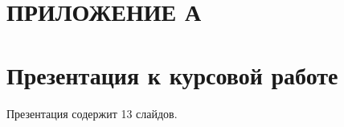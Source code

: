 




    \normalsize



%
%
%
%
%
%
\newpage
\renewcommand{\contentsname}{\normalsize\bfseries\centering СОДЕРЖАНИЕ}
    \tableofcontents
    \normalsize













\section*{\centering ПРИЛОЖЕНИЕ А}

\section*{Презентация к курсовой работе}
Презентация содержит 13 слайдов.

